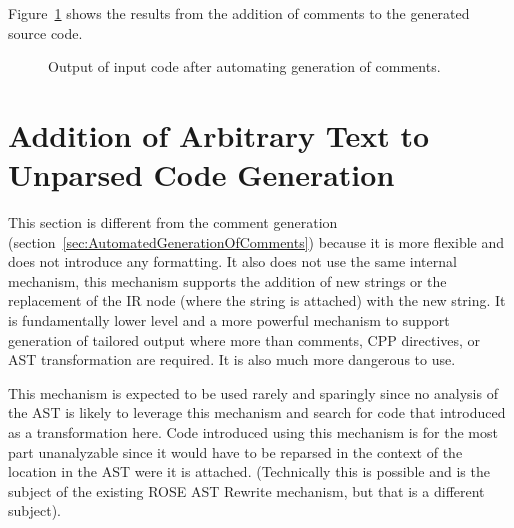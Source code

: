    Figure~\ref{Tutorial:exampleOutput_addComments} 
shows the results from the addition of comments to the generated source code.

\begin{figure}[!h]
{\indent
{\mySmallFontSize

\begin{latexonly}
   
\end{latexonly}

\begin{htmlonly}
   
\end{htmlonly}

}
}
\caption{Output of input code after automating generation of comments.}
\label{Tutorial:exampleOutput_addComments}
\end{figure}



\section{Addition of Arbitrary Text to Unparsed Code Generation}

   This section is different from the comment generation 
(section~\ref{sec:AutomatedGenerationOfComments}) because it 
is more flexible and does not introduce any formatting.  It also
does not use the same internal mechanism, this mechanism supports
the addition of new strings or the replacement of the IR node
(where the string is attached) with the new string.  It is 
fundamentally lower level and a more powerful mechanism to
support generation of tailored output where more than 
comments, CPP directives, or AST transformation are required.
It is also much more dangerous to use.

   This mechanism is expected to be used rarely and sparingly
since no analysis of the AST is likely to leverage this mechanism 
and search for code that introduced as a transformation here.
Code introduced using this mechanism is for the most part
unanalyzable since it would have to be reparsed in the
context of the location in the AST were it is attached.
(Technically this is possible and is the subject of the existing
ROSE AST Rewrite mechanism, but that is a different subject).

